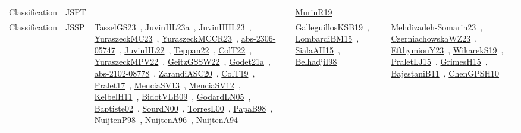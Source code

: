 {\begin{longtable}{lp{3cm}>{\raggedright\arraybackslash}p{6cm}>{\raggedright\arraybackslash}p{6cm}>{\raggedright\arraybackslash}p{8cm}}
Classification & JSPT &  & \href{../works/MurinR19.pdf}{MurinR19}~\cite{MurinR19} & \\
Classification & JSSP & \href{../works/TasselGS23.pdf}{TasselGS23}~\cite{TasselGS23}, \href{../works/JuvinHL23a.pdf}{JuvinHL23a}~\cite{JuvinHL23a}, \href{../works/JuvinHHL23.pdf}{JuvinHHL23}~\cite{JuvinHHL23}, \href{../works/YuraszeckMC23.pdf}{YuraszeckMC23}~\cite{YuraszeckMC23}, \href{../works/YuraszeckMCCR23.pdf}{YuraszeckMCCR23}~\cite{YuraszeckMCCR23}, \href{../works/abs-2306-05747.pdf}{abs-2306-05747}~\cite{abs-2306-05747}, \href{../works/JuvinHL22.pdf}{JuvinHL22}~\cite{JuvinHL22}, \href{../works/Teppan22.pdf}{Teppan22}~\cite{Teppan22}, \href{../works/ColT22.pdf}{ColT22}~\cite{ColT22}, \href{../works/YuraszeckMPV22.pdf}{YuraszeckMPV22}~\cite{YuraszeckMPV22}, \href{../works/GeitzGSSW22.pdf}{GeitzGSSW22}~\cite{GeitzGSSW22}, \href{../works/Godet21a.pdf}{Godet21a}~\cite{Godet21a}, \href{../works/abs-2102-08778.pdf}{abs-2102-08778}~\cite{abs-2102-08778}, \href{../works/ZarandiASC20.pdf}{ZarandiASC20}~\cite{ZarandiASC20}, \href{../works/ColT19.pdf}{ColT19}~\cite{ColT19}, \href{../works/Pralet17.pdf}{Pralet17}~\cite{Pralet17}, \href{../works/MenciaSV13.pdf}{MenciaSV13}~\cite{MenciaSV13}, \href{../works/MenciaSV12.pdf}{MenciaSV12}~\cite{MenciaSV12}, \href{../works/KelbelH11.pdf}{KelbelH11}~\cite{KelbelH11}, \href{../works/BidotVLB09.pdf}{BidotVLB09}~\cite{BidotVLB09}, \href{../works/GodardLN05.pdf}{GodardLN05}~\cite{GodardLN05}, \href{../works/Baptiste02.pdf}{Baptiste02}~\cite{Baptiste02}, \href{../works/SourdN00.pdf}{SourdN00}~\cite{SourdN00}, \href{../works/TorresL00.pdf}{TorresL00}~\cite{TorresL00}, \href{../works/PapaB98.pdf}{PapaB98}~\cite{PapaB98}, \href{../works/NuijtenP98.pdf}{NuijtenP98}~\cite{NuijtenP98}, \href{../works/NuijtenA96.pdf}{NuijtenA96}~\cite{NuijtenA96}, \href{../works/NuijtenA94.pdf}{NuijtenA94}~\cite{NuijtenA94} & \href{../works/GalleguillosKSB19.pdf}{GalleguillosKSB19}~\cite{GalleguillosKSB19}, \href{../works/LombardiBM15.pdf}{LombardiBM15}~\cite{LombardiBM15}, \href{../works/SialaAH15.pdf}{SialaAH15}~\cite{SialaAH15}, \href{../works/BelhadjiI98.pdf}{BelhadjiI98}~\cite{BelhadjiI98} & \href{../works/Mehdizadeh-Somarin23.pdf}{Mehdizadeh-Somarin23}~\cite{Mehdizadeh-Somarin23}, \href{../works/CzerniachowskaWZ23.pdf}{CzerniachowskaWZ23}~\cite{CzerniachowskaWZ23}, \href{../works/EfthymiouY23.pdf}{EfthymiouY23}~\cite{EfthymiouY23}, \href{../works/WikarekS19.pdf}{WikarekS19}~\cite{WikarekS19}, \href{../works/PraletLJ15.pdf}{PraletLJ15}~\cite{PraletLJ15}, \href{../works/GrimesH15.pdf}{GrimesH15}~\cite{GrimesH15}, \href{../works/BajestaniB11.pdf}{BajestaniB11}~\cite{BajestaniB11}, \href{../works/ChenGPSH10.pdf}{ChenGPSH10}~\cite{ChenGPSH10}\\

\end{longtable}}
